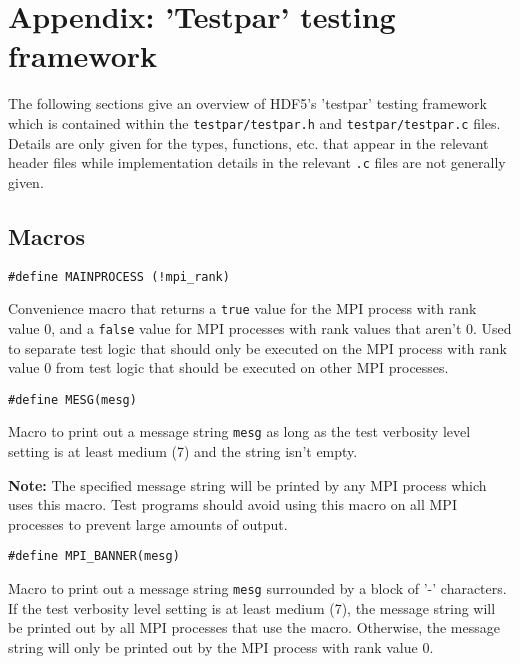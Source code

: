 \documentclass[../HDF5_RFC.tex]{subfiles}
\begin{document}
\newpage

\section{Appendix: 'Testpar' testing framework}
\label{apdx:testpar}

The following sections give an overview of HDF5's 'testpar' testing framework which is contained
within the \texttt{testpar/testpar.h} and \texttt{testpar/testpar.c} files. Details are only given
for the types, functions, etc. that appear in the relevant header files while implementation details
in the relevant \texttt{.c} files are not generally given.

\subsection{Macros}

\begin{verbatim}
#define MAINPROCESS (!mpi_rank)
\end{verbatim}

Convenience macro that returns a \texttt{true} value for the MPI process with rank value 0, and a
\texttt{false} value for MPI processes with rank values that aren't 0. Used to separate test logic
that should only be executed on the MPI process with rank value 0 from test logic that should be
executed on other MPI processes.

\begin{verbatim}
#define MESG(mesg)
\end{verbatim}

Macro to print out a message string \texttt{mesg} as long as the test verbosity level setting is at least medium (7) and the string isn't empty.

\textbf{Note:} The specified message string will be printed by any MPI process which uses this macro.
Test programs should avoid using this macro on all MPI processes to prevent large amounts of output.

\begin{verbatim}
#define MPI_BANNER(mesg)
\end{verbatim}

Macro to print out a message string \texttt{mesg} surrounded by a block of '-' characters. If the test
verbosity level setting is at least medium (7), the message string will be printed out by all MPI processes
that use the macro. Otherwise, the message string will only be printed out by the MPI process with rank
value 0.
\end{document}
